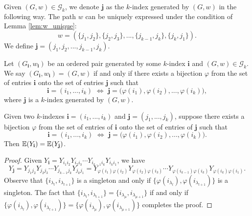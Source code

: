\begin{definition}
  \label{def:g_k_j}
  Given $(G,w) \in \mathcal{G}_k$, we denote $\mathbf{j}$ as the $k$-index generated by $(G,w)$ in the following way. 
  The path $w$ can be uniquely expressed under the condition of Lemma \ref{lem:w_unique}:
  \[
  w = (\{j_1,j_2\},\{j_2,j_3\},...,\{j_{k-1},j_k\},\{j_k,j_1\}).
  \] 
  We define $\mathbf{j} = (j_1,j_2,...,j_{k-1},j_k)$.
\end{definition}
\begin{definition}[$(G_\mathbf{i},w_\mathbf{i}) = (G,w)$ : R-1-6 : def:g\_k\_equiv]
  \label{def:g_k_equiv}
  Let $(G_\mathbf{i},w_\mathbf{i})$ be an ordered pair generated by some $k$-index $\mathbf{i}$ and $(G,w) \in \mathcal{G}_k$.
  We say $(G_\mathbf{i},w_\mathbf{i}) = (G,w)$ if and only if there exists a bijection $\varphi$ from the set of entries $\mathbf{i}$ onto the set of entries $\mathbf{j}$ such that
  \[
  \mathbf{i} = (i_1,...,i_k) \,\, \Longleftrightarrow \,\, \mathbf{j} = \bigl( \varphi(i_1),\varphi(i_2),...,\varphi(i_k) \bigl),
  \]
  where $\mathbf{j}$ is a $k$-index generated by $(G,w)$.
\end{definition}
\begin{lemma}[$\mathbf{i} \sim \mathbf{j} \Rightarrow \mathbb{E}(Y_\mathbf{i}) = \mathbb{E}(Y_\mathbf{j})$ : R-1-7 : lem:eq\_equiv\_eq\_expect]
  \label{lem:eq_equiv_eq_expect}
  Given two $k$-indexes $\mathbf{i} = (i_1,...,i_k)$ and $\mathbf{j} = (j_1,...,j_k)$, 
  suppose there exists a bijection $\varphi$ from the set of entries of $\mathbf{i}$ onto the set of entries of $\mathbf{j}$ such that
  \[
  \mathbf{i} = (i_1,...,i_k) \,\, \Longleftrightarrow \,\, \mathbf{j} = \bigl( \varphi(i_1),\varphi(i_2),...,\varphi(i_k) \bigl).
  \]
  Then $\mathbb{E} (Y_\mathbf{i}) = \mathbb{E} (Y_{\mathbf{j}})$.
\end{lemma}
\begin{proof}
  Given $Y_\mathbf{i} = Y_{i_1 i_2}Y_{i_2 i_3} \cdots Y_{i_{k-1} i_k}Y_{i_k i_1}$, we have
  \[
  Y_{\mathbf{j}} = Y_{j_1 j_2}Y_{j_2 j_3} \cdots Y_{j_{k-1} j_k}Y_{j_k j_1} 
  = Y_{\varphi(i_1) \varphi(i_2)}Y_{\varphi(i_2) \varphi(i_3)} \cdots Y_{\varphi(i_{k-1}) \varphi(i_k)}Y_{\varphi(i_k) \varphi(i_1)}.
  \] 
  Observe that $\{ i_{\lambda_l},i_{\lambda_{l+1}} \}$ is a singleton and only if $\{ \varphi(i_{\lambda_l}),\varphi(i_{\lambda_{l+1}}) \}$ is a singleton.
  The fact that $\{ i_{\lambda_l},i_{\lambda_{l+1}} \} = \{ i_{\lambda_\mu},i_{\lambda_{\mu+1}} \}$ if and only if $\{ \varphi(i_{\lambda_l}),\varphi(i_{\lambda_{l+1}}) \} = \{ \varphi(i_{\lambda_\mu}),\varphi(i_{\lambda_{\mu+1}}) \}$ completes the proof.
\end{proof}
